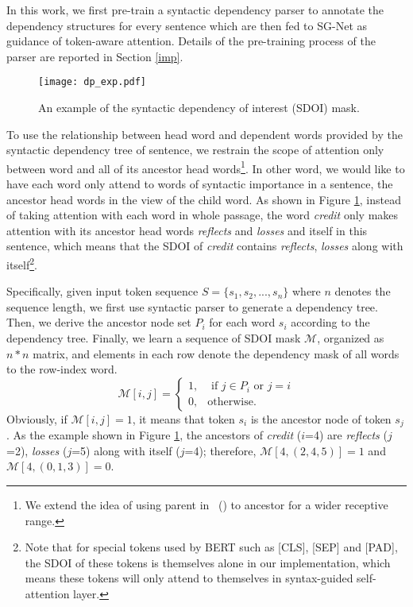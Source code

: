 \documentclass[letterpaper]{article} \usepackage{color}
\begin{document}
In this work, we first pre-train a syntactic dependency parser to annotate the dependency structures for every sentence which are then fed to SG-Net as guidance of token-aware attention. Details of the pre-training process of the parser are reported in Section \ref{imp}. 



\begin{figure}
	\centering
	\texttt{[image: dp\_exp.pdf]}
	\caption{An example of the syntactic dependency of interest (SDOI) mask.}
	\label{dep}
\end{figure}

To use the relationship between head word and dependent words provided by the syntactic dependency tree of sentence, we restrain the scope of attention only between word and all of its ancestor head words\footnote{We extend the idea of using parent in \citeauthor{strubell2018linguistically}~(\citeyear{strubell2018linguistically}) to ancestor for a wider receptive range.}. In other word, we would like to have each word only attend to words of syntactic importance in a sentence, the ancestor head words in the view of the child word. As shown in Figure \ref{dep}, instead of taking attention with each word in whole passage, the word \textit{credit} only makes attention with its ancestor head words \textit{reflects} and \textit{losses} and itself in this sentence, which means that the SDOI of \textit{credit} contains \textit{reflects}, \textit{losses} along with itself\footnote{Note that for special tokens used by BERT such as [CLS], [SEP] and [PAD], the SDOI of these tokens is themselves alone in our implementation, which means these tokens will only attend to themselves in syntax-guided self-attention layer.}.

Specifically, given input token sequence $S=\{s_1,s_2,...,s_n\}$ where $n$ denotes the sequence length, we first use syntactic parser to generate a dependency tree. Then, we derive the ancestor node set $P_i$ for each word $s_i$ according to the dependency tree.  Finally, we learn a sequence of SDOI
mask $\mathcal{M}$, organized as $n*n$ matrix, and elements in each row denote the dependency mask of all words to the row-index word.\begin{equation}
\mathcal{M}[i,j] = \left\{\begin{matrix}
1, & {\text{ if } j} \in {P_i}\text{ or }j=i \\ 
0, & \text{otherwise}.
\end{matrix}\right.
\end{equation}Obviously, if $\mathcal{M}[i,j]=1$, it means that token $s_i$ is the ancestor node of token $s_j$. As the example shown in Figure \ref{dep}, the ancestors of \textit{credit} ($i$=4) are \textit{reflects} ($j$=2), \textit{losses} ($j$=5) along with itself ($j$=4); therefore, $\mathcal{M}[4, (2,4,5)]=1$ and $\mathcal{M}[4, (0,1,3)]=0$.
\end{document}
